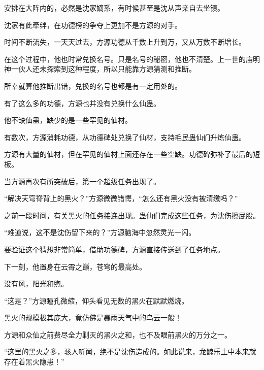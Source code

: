 \begin{this_body}
安排在大阵内的，必然是沈家嫡系，有时候甚至是沈从声亲自去坐镇。

沈家有此牵绊，在功德榜的争夺上更加不是方源的对手。

时间不断流失，一天天过去，方源功德从千数上升到万，又从万数不断增长。

在这个过程中，他也时常兑换名号。只是名号的秘密，他也不清楚。上一世的庙明神一伙人还未探索到这种程度，所以只能靠方源猜测和推断。

所幸就算他推断出错，兑换的名号也都是有一定用处的。

有了这么多的功德，方源也并没有兑换什么仙蛊。

他不缺仙蛊，缺少的是一些罕见的仙材。

有数次，方源消耗功德，从功德碑处兑换了仙材，支持毛民蛊仙们升炼仙蛊。

方源有大量的仙材，但在罕见的仙材上面还存在一些空缺。功德碑弥补了最后的短板。

当方源再次有所突破后，第一个超级任务出现了。

“解决天穹脊背上的黑火？”方源微微错愕，“怎么还有黑火没有被清缴吗？”

之前一段时间，有关黑火的任务接连出现。蛊仙们完成这些任务，为沈伤擦屁股。

“难道说，这不是沈伤留下来的？”方源脑海中忽然灵光一闪。

要验证这个猜想非常简单，借助功德碑，方源直接传送到了任务地点。

下一刻，他置身在云霄之巅，苍穹的最高处。

没有风，阳光和煦。

“这是？”方源瞳孔微缩，仰头看见无数的黑火在默默燃烧。

黑火的规模极其庞大，竟仿佛是暴雨天气中的乌云一般！

方源和众仙之前费尽全力剿灭的黑火之和，也不及眼前黑火的万分之一。

“这里的黑火之多，骇人听闻，绝不是沈伤造成的。如此说来，龙鲸乐土中本来就存在着黑火隐患！”

\end{this_body}

